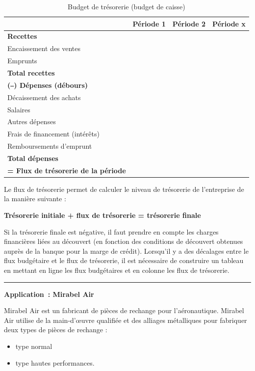 \documentclass[oneside]{kaobook}
\begin{document}
\begin{table}[htbp]
\caption{Budget de trésorerie (budget de caisse)}
\centering
\footnotesize
\begin{tabular}{llll}
 & Période 1 & Période 2 & Période x\\
\hline
\textbf{Recettes} &  &  & \\
Encaissement des ventes &  &  & \\
Emprunts &  &  & \\
\textbf{Total recettes} &  &  & \\
\textbf{(‒) Dépenses (débours)} &  &  & \\
Décaissement des achats &  &  & \\
Salaires &  &  & \\
Autres dépenses &  &  & \\
Frais de financement (intérêts) &  &  & \\
Remboursements d’emprunt &  &  & \\
\textbf{Total dépenses} &  &  & \\
\textbf{= Flux de trésorerie de la période} &  &  & \\
\end{tabular}
\end{table}


Le flux de trésorerie permet de calculer le niveau de trésorerie de l'entreprise de la manière suivante : 
\begin{center}
\textbf{Trésorerie initiale + flux de trésorerie = trésorerie finale}
\end{center}
Si la trésorerie finale est négative, il faut prendre en compte les charges financières liées au découvert (en fonction des conditions de découvert obtenues auprès de la banque pour la marge de crédit). 
Lorsqu'il y a des décalages entre le flux budgétaire et le flux de trésorerie, il est nécessaire de construire un tableau en mettant en ligne les flux budgétaires et en colonne les flux de trésorerie.

\noindent\rule{\textwidth}{0.5pt}
\textbf{Application : Mirabel Air}

Mirabel Air est un fabricant de pièces de rechange pour l’aéronautique. Mirabel Air utilise de la main-d’œuvre qualifiée et des alliages métalliques pour fabriquer deux types de pièces de rechange :
\begin{itemize}
\item type normal
\item type hautes performances.
\end{itemize}
\end{document}
